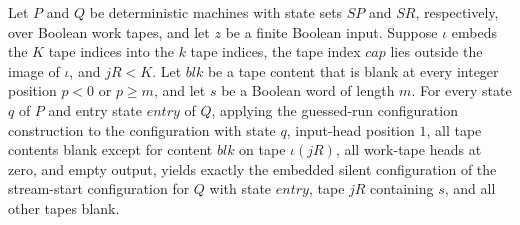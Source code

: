 \begin{theorem}
\label{Turing.guessRunCfg_clean}
\leanok
{}
Let $P$ and $Q$ be deterministic machines with state sets $SP$ and $SR$, respectively,
over Boolean work tapes, and let $z$ be a finite Boolean input. Suppose $\iota$ embeds
the $K$ tape indices into the $k$ tape indices, the tape index $cap$ lies outside the
image of $\iota$, and $jR<K$. Let $blk$ be a tape content that is blank at every integer
position $p<0$ or $p\ge m$, and let $s$ be a Boolean word of length $m$. For every state
$q$ of $P$ and entry state $entry$ of $Q$, applying the guessed-run configuration
construction to the configuration with state $q$, input-head position $1$, all tape
contents blank except for content $blk$ on tape $\iota(jR)$, all work-tape heads at
zero, and empty output, yields exactly the embedded silent configuration of the
stream-start configuration for $Q$ with state $entry$, tape $jR$ containing $s$, and all
other tapes blank.
\end{theorem}

